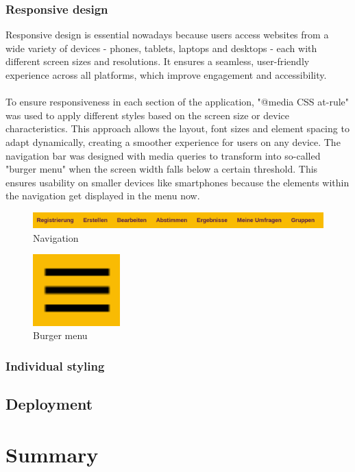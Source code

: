 \documentclass[a4paper,12pt]{report}
\begin{document}
\subsection{Responsive design}
Responsive design is essential nowadays because users access websites from a wide variety of devices - phones, tablets, laptops and desktops - each with different screen sizes and resolutions. It ensures a seamless, user-friendly experience across all platforms, which improve engagement and accessibility.\\ \\
To ensure responsiveness in each section of the application, "@media CSS at-rule" was used to apply different styles based on the screen size or device characteristics. This approach allows the layout, font sizes and element spacing to adapt dynamically, creating a smoother experience for users on any device. The navigation bar was designed with media queries to transform into so-called "burger menu" when the screen width falls below a certain threshold. This ensures usability on smaller devices like smartphones because the elements within the navigation get displayed in the menu now.
\begin{figure}[h!]
	\centering
	\includegraphics[width=1\textwidth]{pics/navigation.png}
	\caption{Navigation}
	\label{fig:navigation}
\end{figure}
\begin{figure}[H]
	\centering
	\includegraphics[width=0.3\textwidth]{pics/burger_menu.png}
	\caption{Burger menu}
	\label{fig:burger_menu}
\end{figure}
\subsection{Individual styling}

\section{Deployment}

\chapter{Summary}

\printbibliography

\listoffigures
\newpage
\end{document}
